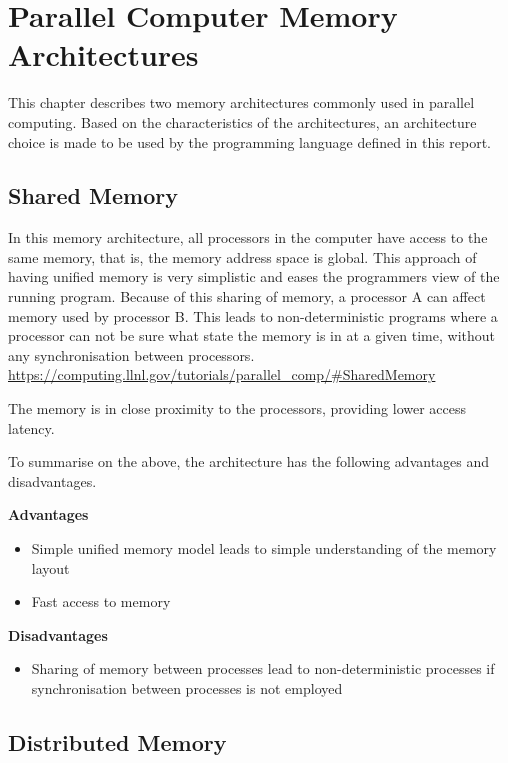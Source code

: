 \chapter{Parallel Computer Memory Architectures}

This chapter describes two memory architectures commonly used in parallel computing. Based on the characteristics of the architectures, an architecture choice is made to be used by the programming language defined in this report.

\section{Shared Memory}

In this memory architecture, all processors in the computer have access to the same memory, that is, the memory address space is global. This approach of having unified memory is very simplistic and eases the programmers view of the running program. Because of this sharing of memory, a processor A can affect memory used by processor B. This leads to non-deterministic programs where a processor can not be sure what state the memory is in at a given time, without any synchronisation between processors. \url{https://computing.llnl.gov/tutorials/parallel_comp/#SharedMemory}

The memory is in close proximity to the processors, providing lower access latency. 

To summarise on the above, the architecture has the following advantages and disadvantages.

\noindent\textbf{Advantages}
\begin{itemize}
    \item Simple unified memory model leads to simple understanding of the memory layout
    \item Fast access to memory
\end{itemize}

\noindent\textbf{Disadvantages}
\begin{itemize}
    \item Sharing of memory between processes lead to non-deterministic processes if synchronisation between processes is not employed
\end{itemize}

\section{Distributed Memory}

